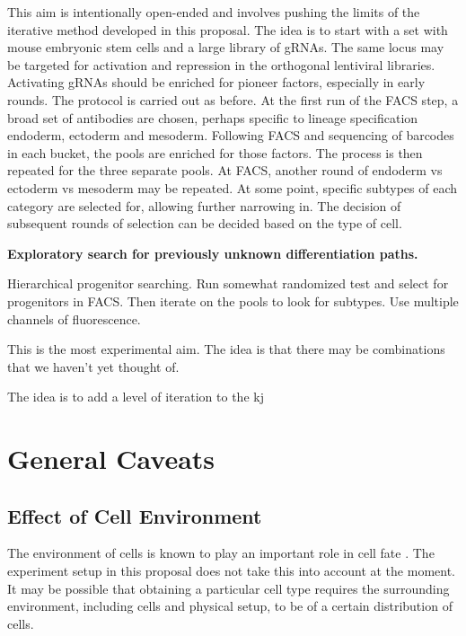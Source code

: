 \documentclass[10pt]{article}
\begin{document}
This aim is intentionally open-ended and involves pushing the limits of the iterative method developed in this proposal. The idea is to start with a set with mouse embryonic stem cells and a large library of gRNAs. The same locus may be targeted for activation and repression in the orthogonal lentiviral libraries. Activating gRNAs should be enriched for pioneer factors, especially in early rounds. The protocol is carried out as before. At the first run of the FACS step, a broad set of antibodies are chosen, perhaps specific to lineage specification endoderm, ectoderm and mesoderm. Following FACS and sequencing of barcodes in each bucket, the pools are enriched for those factors. The process is then repeated for the three separate pools. At FACS, another round of endoderm vs ectoderm vs mesoderm may be repeated. At some point, specific subtypes of each category are selected for, allowing further narrowing in. The decision of subsequent rounds of selection can be decided based on the type of cell.

\textbf{Exploratory search for previously unknown differentiation paths.}

Hierarchical progenitor searching. Run somewhat randomized test and select for progenitors in FACS. Then iterate on the pools to look for subtypes. Use multiple channels of fluorescence.

This is the most experimental aim. The idea is that there may be combinations that we haven't yet thought of.

The idea is to add a level of iteration to the kj

\section*{General Caveats}

\subsection*{Effect of Cell Environment}

The environment of cells is known to play an important role in cell fate \cite{drummond2008stem}. The experiment setup in this proposal does not take this into account at the moment. It may be possible that obtaining a particular cell type requires the surrounding environment, including cells and physical setup, to be of a certain distribution of cells.

\end{document}
